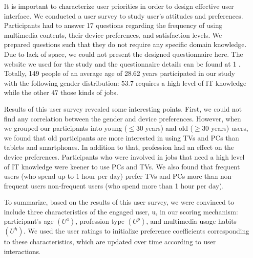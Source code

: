 \documentclass[]{IEEEphot}
\begin{document}
It is important to characterize user priorities in order to design effective user
interface. We conducted a user survey to study user’s attitudes and preferences.
Participants had to answer 17 questions regarding the frequency of using multimedia contents, their device preferences, and satisfaction levels. We prepared
questions such that they do not require any specific domain knowledge. Due to
lack of space, we could not present the designed questionnaire here. The website
we used for the study and the questionnaire details can be found at 1
. Totally,
149 people of an average age of 28.62 years participated in our study with the
following gender distribution: 53.7%
requires a high level of IT knowledge while the other 47%
those kinds of jobs.



Results of this user survey revealed some interesting points. First, we could
not find any correlation between the gender and device preferences. However,
when we grouped our participants into young ($\leq$30 years) and old ($\geq$30 years)
users, we found that old participants are more interested in using TVs and PCs
than tablets and smartphones. In addition to that, profession had an effect on
the device preferences. Participants who were involved in jobs that need a high
level of IT knowledge were keener to use PCs and TVs. We also found that
frequent users (who spend up to 1 hour per day) prefer TVs and PCs more than
non-frequent users non-frequent users (who spend more than 1 hour per day).


To summarize, based on the results of this user survey, we were convinced to
include three characteristics of the engaged user, u, in our scoring mechanism:
participant’s age $(U^{a})$, profession type $(U^{p})$, and multimedia usage habits $(U^{h})$.
We used the user ratings to initialize preference coefficients corresponding to
these characteristics, which are updated over time according to user interactions.
\end{document}
